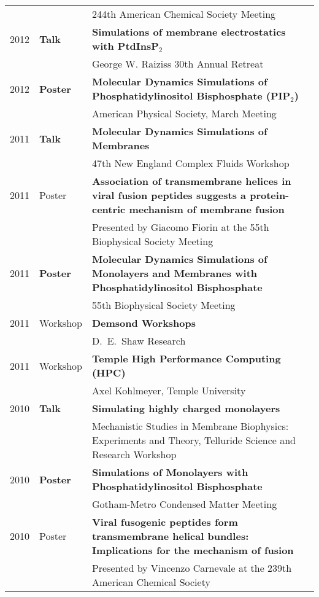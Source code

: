 \documentclass[letterpaper,11pt]{article}
\begin{document}
\begin{tabular}{ll p{14 cm}}
     && 244th American Chemical Society Meeting \\
2012 & \bf{Talk} & \textbf{Simulations of membrane electrostatics with PtdInsP$_2$}\\
     && George W. Raiziss 30th Annual Retreat \\
2012 & \bf{Poster} & \textbf{Molecular Dynamics Simulations of Phosphatidylinositol Bisphosphate (PIP$_2$)}\\
     && American Physical Society, March Meeting\\
2011 & \bf{Talk} & \textbf{Molecular Dynamics Simulations of Membranes}\\
     && 47th New England Complex Fluids Workshop \\
2011 & Poster & \textbf{Association of transmembrane helices in viral fusion peptides suggests a protein-centric mechanism of membrane fusion} \\
     && Presented by Giacomo Fiorin at the 55th Biophysical Society Meeting \\
2011 & \bf{Poster} & \textbf{Molecular Dynamics Simulations of Monolayers and Membranes with Phosphatidylinositol Bisphosphate} \\
     && 55th Biophysical Society Meeting\\
2011 & Workshop & \textbf{Demsond Workshops} \\
     && D.~E.~Shaw Research\\
2011 & Workshop & \textbf{Temple High Performance Computing (HPC)}\\
     && Axel Kohlmeyer, Temple University\\
2010 & \bf{Talk} & \textbf{Simulating highly charged monolayers}\\
     && Mechanistic Studies in Membrane Biophysics: Experiments and Theory, 
Telluride Science and Research Workshop\\
2010 & \bf{Poster} & \textbf{Simulations of Monolayers with Phosphatidylinositol Bisphosphate}\\
     && Gotham-Metro Condensed Matter Meeting\\
2010 & Poster & \textbf{Viral fusogenic peptides form transmembrane helical bundles: Implications for the mechanism of fusion}\\
     && Presented by Vincenzo Carnevale at the 239th American Chemical Society\\
\end{tabular}
\end{document}

